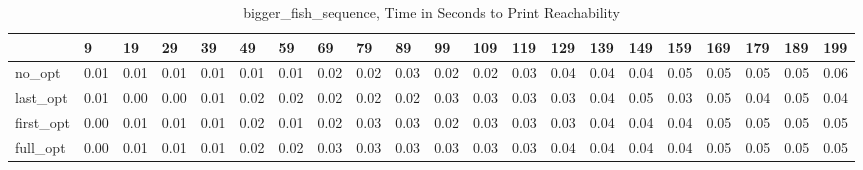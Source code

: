 \begin{table}
\caption{bigger_fish_sequence, Time in Seconds to Print Reachability}
\label{bigger_fish_sequence_states_time}
\begin{tabular}{lllllllllllllllllllll}
\toprule
 & 9 & 19 & 29 & 39 & 49 & 59 & 69 & 79 & 89 & 99 & 109 & 119 & 129 & 139 & 149 & 159 & 169 & 179 & 189 & 199 \\
\midrule
no_opt & 0.01 & 0.01 & 0.01 & 0.01 & 0.01 & 0.01 & 0.02 & 0.02 & 0.03 & 0.02 & 0.02 & 0.03 & 0.04 & 0.04 & 0.04 & 0.05 & 0.05 & 0.05 & 0.05 & 0.06 \\
last_opt & 0.01 & 0.00 & 0.00 & 0.01 & 0.02 & 0.02 & 0.02 & 0.02 & 0.02 & 0.03 & 0.03 & 0.03 & 0.03 & 0.04 & 0.05 & 0.03 & 0.05 & 0.04 & 0.05 & 0.04 \\
first_opt & 0.00 & 0.01 & 0.01 & 0.01 & 0.02 & 0.01 & 0.02 & 0.03 & 0.03 & 0.02 & 0.03 & 0.03 & 0.03 & 0.04 & 0.04 & 0.04 & 0.05 & 0.05 & 0.05 & 0.05 \\
full_opt & 0.00 & 0.01 & 0.01 & 0.01 & 0.02 & 0.02 & 0.03 & 0.03 & 0.03 & 0.03 & 0.03 & 0.03 & 0.04 & 0.04 & 0.04 & 0.04 & 0.05 & 0.05 & 0.05 & 0.05 \\
\bottomrule
\end{tabular}
\end{table}

